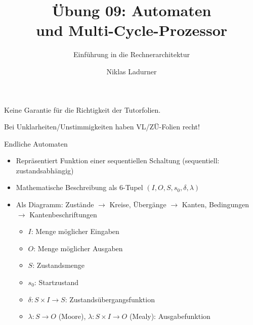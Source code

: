 \documentclass[
  german,            %
  aspectratio=169,    %
]{tumbeamer}
\title{Übung 09: Automaten \\und
	Multi-Cycle-Prozessor}
\subtitle{Einführung in die Rechnerarchitektur}
\author{Niklas Ladurner}
\institute{\theChairName\\\theDepartmentName\\\theUniversityName}
\date{\DTMdisplaydate{2024}{12}{13}{-1}}
\begin{document}
\maketitle

\begin{frame}[c, fragile]{}{}
	\begin{center}
		\LARGE  Keine Garantie für die Richtigkeit der Tutorfolien.

		\Large Bei Unklarheiten/Unstimmigkeiten haben VL/ZÜ-Folien recht!
	\end{center}
\end{frame}

\begin{frame}[fragile, c]{Endliche Automaten}{}
	\begin{itemize}
		\item Repräsentiert Funktion einer sequentiellen Schaltung (sequentiell: zustandsabhängig)
		\item Mathematische Beschreibung als 6-Tupel $(I, O, S, s_0, \delta, \lambda)$
		\item Als Diagramm: Zustände $\rightarrow$ Kreise, Übergänge $\rightarrow$ Kanten, Bedingungen $\rightarrow$ Kantenbeschriftungen
		      \begin{itemize}
			      \item $I$: Menge möglicher Eingaben
			      \item $O$: Menge möglicher Ausgaben
			      \item $S$: Zustandsmenge
			      \item $s_0$: Startzustand
			      \item $\delta:  S\times I\rightarrow S$: Zustandsübergangsfunktion
			      \item $\lambda: S\rightarrow O$ (Moore), $\lambda: S\times I\rightarrow O$ (Mealy): Ausgabefunktion
		      \end{itemize}
	\end{itemize}
\end{frame}
\end{document}
